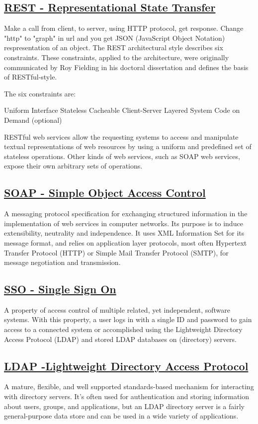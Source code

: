 \documentclass[11pt]{article}
\begin{document}
\subsection{\href{https://www.restapitutorial.com/lessons/whatisrest.html}{REST - Representational State Transfer}}
\label{sec:org67af9a8}
Make a call from client, to server, using HTTP protocol, get response. Change "http" to "graph" in url and you get JSON (JavaScript Object Notation)  respresentation of an object.
The REST architectural style describes six constraints. These constraints, applied to the architecture, were originally communicated by Roy Fielding in his doctoral dissertation and defines the basis of RESTful-style.

The six constraints are:

Uniform Interface
Stateless
Cacheable
Client-Server
Layered System
Code on Demand (optional)

RESTful web services allow the requesting systems to access and manipulate textual representations of web resources by using a uniform and predefined set of stateless operations. Other kinds of web services, such as SOAP web services, expose their own arbitrary sets of operations.
\subsection{\href{https://en.wikipedia.org/wiki/SOAP}{SOAP - Simple Object Access Control}}
\label{sec:org964af8c}
A messaging protocol specification for exchanging structured information in the implementation of web services in computer networks. Its purpose is to induce extensibility, neutrality and independence. It uses XML Information Set for its message format, and relies on application layer protocols, most often Hypertext Transfer Protocol (HTTP) or Simple Mail Transfer Protocol (SMTP), for message negotiation and transmission.
\subsection{\href{https://en.wikipedia.org/wiki/Single\_sign-on}{SSO - Single Sign On}}
\label{sec:org444d575}
A property of access control of multiple related, yet independent, software systems. With this property, a user logs in with a single ID and password to gain access to a connected system or accomplished using the Lightweight Directory Access Protocol (LDAP) and stored LDAP databases on (directory) servers.
\subsection{\href{https://ldap.com/}{LDAP -Lightweight Directory Access Protocol}}
\label{sec:orgd451f27}
A mature, flexible, and well supported standards-based mechanism for interacting with directory servers. It’s often used for authentication and storing information about users, groups, and applications, but an LDAP directory server is a fairly general-purpose data store and can be used in a wide variety of applications.
\end{document}
